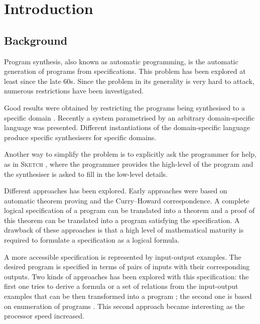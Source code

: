 
\chapter{Introduction}\label{ch:introduction}

\section{Background}

Program synthesis, also known as automatic programming, is the automatic generation of programs from specifications. This problem has been explored at least since the late 60s. Since the problem in its generality is very hard to attack, numerous restrictions have been investigated.

Good results were obtained by restricting the programs being synthesised to a specific domain \cite{Fischer:2003:ASG:967842.967845,Frigo98fftw:an,Thies2002,Gulwani:2011:ASP:1926385.1926423,Gulwani:2011:SGC:1993498.1993505}. Recently a system parametrised by an arbitrary domain-specific language \cite{Perelman:2014:TS:2594291.2594297} was presented. Different instantiations of the domain-specific language produce specific synthesisers for specific domains.

Another way to simplify the problem is to explicitly ask the programmer for help, as in \textsc{Sketch} \cite{Solar-Lezama:2006:CSF:1168857.1168907}, where the programmer provides the high-level of the program and the synthesiser is asked to fill in the low-level details.

Different approaches has been explored.
Early approaches \cite{Manna:1980:DAP:357084.357090} were based on automatic theorem proving and the Curry–Howard correspondence. A complete logical specification of a program can be translated into a theorem and a proof of this theorem can be translated into a program satisfying the specification.
A drawback of these approaches is that a high level of mathematical maturity is required to formulate a specification as a logical formula.

A more accessible specification is represented by input-output examples. The desired program is specified in terms of pairs of inputs with their corresponding outputs. Two kinds of approaches has been explored with this specification: the first one tries to derive a formula or a set of relations from the input-output examples that can be then transformed into a program \cite{Summers:1977:MLP:321992.322002,Kitzelmann:2009:AIF:1530575.1530582,Jha:2010:OCP:1806799.1806833}; the second one is based on enumeration of programs \cite{LambdaSquarePaper,EscherPaper,MythPaper}. This second approach became interesting as the processor speed increased.

